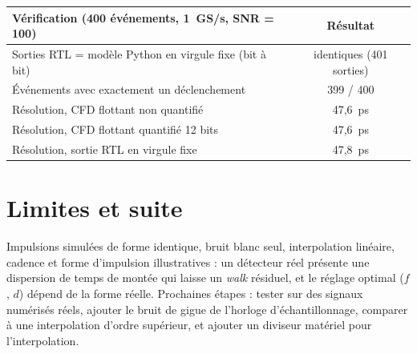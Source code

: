\documentclass[10pt,a4paper]{article}
\begin{document}
\begin{center}\small
\begin{tabular}{lc}\toprule
Vérification (400 événements, 1~GS/s, SNR = 100) & Résultat \\ \midrule
Sorties RTL = modèle Python en virgule fixe (bit à bit) & identiques (401 sorties) \\
Événements avec exactement un déclenchement & 399 / 400 \\
Résolution, CFD flottant non quantifié & 47,6~ps \\
Résolution, CFD flottant quantifié 12 bits & 47,6~ps \\
Résolution, sortie RTL en virgule fixe & 47,8~ps \\ \bottomrule
\end{tabular}
\end{center}

\section{Limites et suite}
Impulsions simulées de forme identique, bruit blanc seul, interpolation linéaire, cadence et forme d'impulsion illustratives : un détecteur réel présente une dispersion de temps de montée qui laisse un \emph{walk} résiduel, et le réglage optimal ($f$, $d$) dépend de la forme réelle. Prochaines étapes : tester sur des signaux numérisés réels, ajouter le bruit de gigue de l'horloge d'échantillonnage, comparer à une interpolation d'ordre supérieur, et ajouter un diviseur matériel pour l'interpolation.
\end{document}
